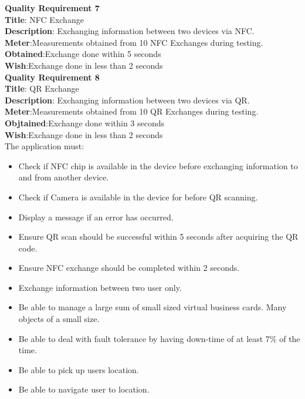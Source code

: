 \documentclass[english]{article}
\begin{document}
				\textbf{Quality Requirement 7}\\
				\textbf{Title}: NFC Exchange\\
				\textbf{Description}: Exchanging information between two devices via NFC.\\
				\textbf{Meter}:Measurements obtained from 10 NFC Exchanges during testing.\\
				\textbf{Obtained}:Exchange done within 5 seconds\\
				\textbf{Wish}:Exchange done in less than 2 seconds\\
				
				\textbf{Quality Requirement 8}\\
				\textbf{Title}: QR Exchange\\
				\textbf{Description}: Exchanging information between two devices via QR.\\
				\textbf{Meter}:Measurements obtained from 10 QR Exchanges during testing.\\
				\textbf{Objtained}:Exchange done within 3 seconds\\
				\textbf{Wish}:Exchange done in less than 2 seconds\\
				The application must:
				\begin{itemize}
					\item 
					Check if NFC chip is available in the device before exchanging information to and from another device.
					\item
					Check if Camera is available in the device for before QR scanning.  
					\item
					Display a message if an error has occurred.
					\item
					Ensure QR scan should be successful within 5 seconds after acquiring the QR code.
					\item
					Ensure NFC exchange should be completed within 2 seconds.
					\item
					Exchange information between two user only.
					\item
					Be able to manage a large sum of small sized virtual business cards. Many objects of a small size.
					\item
					Be able to deal with fault tolerance by having down-time of at least 7\% of the time.
					\item
					Be able to pick up users location.
					\item 
					Be able to navigate user to location.
					
				\end{itemize}
\end{document}
